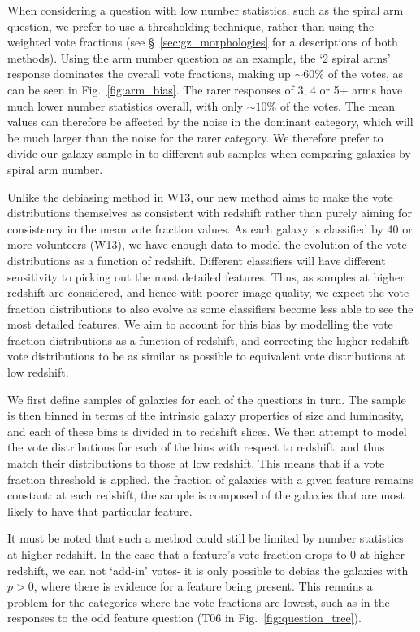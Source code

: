 \documentclass[useAMS,usenatbib]{mn2e}
\begin{document}
When considering a question with low number statistics, such as the spiral arm question, we prefer to use a thresholding technique, rather than using the weighted vote fractions (see \S~\ref{sec:gz_morphologies} for a descriptions of both methods). Using the arm number question as an example, the `2 spiral arms' response dominates the overall vote fractions, making up $\sim 60 \%$ of the votes, as can be seen in Fig.~\ref{fig:arm_bias}. The rarer responses of 3, 4 or 5+ arms have much lower number statistics overall, with only $\sim 10 \%$ of the votes. The mean values can therefore be affected by the noise in the dominant category, which will be much larger than the noise for the rarer category. We therefore prefer to divide our galaxy sample in to different sub-samples when comparing galaxies by spiral arm number.

Unlike the debiasing method in W13, our new method aims to make the vote distributions themselves as consistent with redshift rather than purely aiming for consistency in the mean vote fraction values. As each galaxy is classified by 40 or more volunteers (W13), we have enough data to model the evolution of the vote distributions as a function of redshift. Different classifiers will have different sensitivity to picking out the most detailed features. Thus, as samples at higher redshift are considered, and hence with poorer image quality, we expect the vote fraction distributions to also evolve as some classifiers become less able to see the most detailed features. We aim to account for this bias by modelling the vote fraction distributions as a function of redshift, and correcting the higher redshift vote distributions to be as similar as possible to equivalent vote distributions at low redshift. 

We first define samples of galaxies for each of the questions in turn. The sample is then binned in terms of the intrinsic galaxy properties of size and luminosity, and each of these bins is divided in to redshift slices. We then attempt to model the vote distributions for each of the bins with respect to redshift, and thus match their distributions to those at low redshift. This means that if a vote fraction threshold is applied, the fraction of galaxies with a given feature remains constant: at each redshift, the sample is composed of the galaxies that are most likely to have that particular feature. 

It must be noted that such a method could still be limited by number statistics at higher redshift. In the case that a feature's vote fraction drops to 0 at higher redshift, we can not `add-in' votes- it is only possible to debias the galaxies with $p>0$, where there is evidence for a feature being present. This remains a problem for the categories where the vote fractions are lowest, such as in the responses to the odd feature question (T06 in Fig.~\ref{fig:question_tree}).
\end{document}
